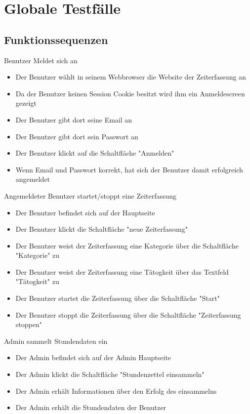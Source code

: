 \section{Globale Testfälle}

\subsection{Funktionssequenzen}
\begin{requirements}

	 Benutzer Meldet sich an
	\begin{itemize}
  			\item Der Benutzer wählt in seinem Webbrowser die Website der Zeiterfassung an
  			\item Da der Benutzer keinen Session Cookie besitzt wird ihm ein Anmeldescreen gezeigt
  			\item Der Benutzer gibt dort seine Email an
  			\item Der Benutzer gibt dort sein Passwort an
  			\item Der Benutzer klickt auf die Schaltfläche "Anmelden"
  			\item Wenn Email und Passwort korrekt, hat sich der Benutzer damit erfolgreich angemeldet
    \end{itemize}

     Angemeldeter Benutzer startet/stoppt eine Zeiterfassung
    \begin{itemize}
        \item Der Benutzer befindet sich auf der Hauptseite
        \item Der Benutzer klickt die Schaltfläche "neue Zeiterfassung"
        \item Der Benutzer weist der Zeiterfassung eine Kategorie über die Schaltfläche "Kategorie" zu
        \item Der Benutzer weist der Zeiterfassung eine Tätogkeit über das Textfeld "Tätogkeit" zu
        \item Der Benutzer startet die Zeiterfassung über die Schaltfläche "Start"
        \item Der Benutzer stoppt die Zeiterfassung über die Schaltfläche "Zeiterfassung stoppen"
    \end {itemize}

     Admin sammelt Stundendaten ein
    \begin{itemize}
            \item Der Admin befindet sich auf der Admin Hauptseite
            \item Der Admin klickt die Schaltfläche "Stundenzettel einsammeln"
            \item Der Admin erhält Informationen über den Erfolg des einsammelns
            \item Der Admin erhält die Stundendaten der Benutzer
        \end {itemize}


\end{requirements}
